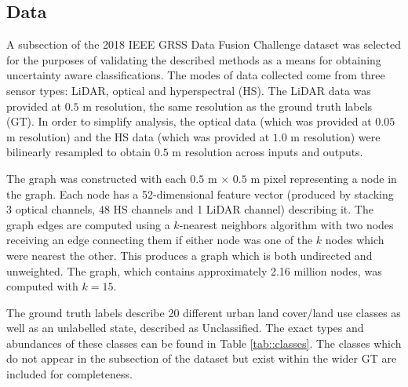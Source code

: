 \documentclass[journal]{IEEEtran}
\begin{document}
\subsection{Data}
A subsection of the 2018 IEEE GRSS Data Fusion Challenge dataset was selected for the purposes of validating the described methods as a means for obtaining uncertainty aware classifications. The modes of data collected come from three sensor types: LiDAR, optical and hyperspectral (HS). The LiDAR data was provided at $0.5$ m resolution, the same resolution as the ground truth labels (GT). In order to simplify analysis, the optical data (which was provided at $0.05$ m resolution) and the HS data (which was provided at $1.0$ m resolution) were bilinearly resampled to obtain $0.5$ m resolution across inputs and outputs. 

The graph was constructed with each $0.5$ m $\times$ $0.5$ m pixel representing a node in the graph. Each node has a 52-dimensional feature vector (produced by stacking 3 optical channels, 48 HS channels and 1 LiDAR channel) describing it. The graph edges are computed using a $k$-nearest neighbors algorithm with two nodes receiving an edge connecting them if either node was one of the $k$ nodes which were nearest the other. This produces a graph which is both undirected and unweighted. The graph, which contains approximately 2.16 million nodes, was computed with $k=15$.

The ground truth labels describe 20 different urban land cover/land use classes as well as an unlabelled state, described as Unclassified. The exact types and abundances of these classes can be found in Table \ref{tab::classes}. The classes which do not appear in the subsection of the dataset but exist within the wider GT are included for completeness.
\end{document}
